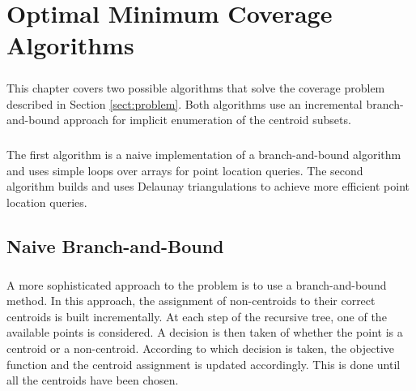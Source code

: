 \chapter{Optimal Minimum Coverage Algorithms}
\label{chap:algos}
\paragraph{}
This chapter covers two possible algorithms that solve the coverage problem described in Section \ref{sect:problem}. Both algorithms use an incremental branch-and-bound approach for implicit enumeration of the centroid subsets. 
\paragraph{}
The first algorithm is a naive implementation of a branch-and-bound algorithm and uses simple loops over arrays for point location queries. The second algorithm builds and uses Delaunay triangulations to achieve more efficient point location queries.

\section{Naive Branch-and-Bound}
\label{alg:bb}
\paragraph{}
A more sophisticated approach to the problem is to use a branch-and-bound method.
In this approach, the assignment of non-centroids to their correct centroids is built incrementally.
At each step of the recursive tree, one of the available points is considered. A decision is then taken of whether the point is a centroid or a non-centroid. According to which decision is taken, the objective function and the centroid assignment is updated accordingly. This is done until all the centroids have been chosen.
